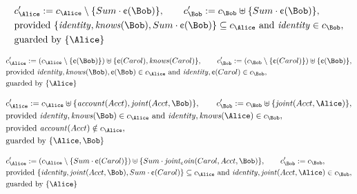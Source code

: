 \begin{align*}
&
c'_
{
\Alice
}
 := 
c_
{
\Alice
}
 \setminus 
\{
Sum
\cdot
\text{\textcent}
(
\Bob
)
\}
, \qquad 
c'_
{
\Bob
}
 := 
c_
{
\Bob
}
 \uplus 
\{
Sum
\cdot
\text{\textcent}
(
\Bob
)
\}
,\\
&
\text{provided } 
\{
\mathit{
identity
}
,
\mathit{
knows
}
(
\Bob
)
,
Sum
\cdot
\text{\textcent}
(
\Bob
)
\}
 \subseteq c_
{
\Alice
}
 \text{ and } 
\mathit{
identity
}
 \in c_
{
\Bob
}
,\\
&
\text{guarded by } \{
\Alice
\}
\end{align*}

\begin{align*}
&
c'_
{
\Alice
}
 := 
(c_
{
\Alice
}
 \setminus 
\{
\text{\textcent}
(
\Bob
)
\}
) \uplus 
\{
\text{\textcent}
(
Carol
)
,
\mathit{
knows
}
(
Carol
)
\}
, \qquad 
c'_
{
\Bob
}
 := 
(c_
{
\Bob
}
 \setminus 
\{
\text{\textcent}
(
Carol
)
\}
) \uplus 
\{
\text{\textcent}
(
\Bob
)
\}
,\\
&
\text{provided } 
\mathit{
identity
}
,
\mathit{
knows
}
(
\Bob
)
,
\text{\textcent}
(
\Bob
)
 \in c_
{
\Alice
}
 \text{ and } 
\mathit{
identity
}
,
\text{\textcent}
(
Carol
)
 \in c_
{
\Bob
}
,\\
&
\text{guarded by } \{
\Alice
\}
\end{align*}

\begin{align*}
&
c'_
{
\Alice
}
 := 
c_
{
\Alice
}
 \uplus 
\{
\mathit{
account
}
(
Acct
)
,
\mathit{
joint
}
(
Acct
,
\Bob
)
\}
, \qquad 
c'_
{
\Bob
}
 := 
c_
{
\Bob
}
 \uplus 
\{
\mathit{
joint
}
(
Acct
,
\Alice
)
\}
,\\
&
\text{provided } 
\mathit{
identity
}
,
\mathit{
knows
}
(
\Bob
)
 \in c_
{
\Alice
}
 \text{ and } 
\mathit{
identity
}
,
\mathit{
knows
}
(
\Alice
)
 \in c_
{
\Bob
}
,\\
&
\text{provided } 
\mathit{
account
}
(
Acct
)
 \notin c_
{
\Alice
}
,\\
&
\text{guarded by } \{
\Alice
,
\Bob
\}
\end{align*}

\begin{align*}
&
c'_
{
\Alice
}
 := 
(c_
{
\Alice
}
 \setminus 
\{
Sum
\cdot
\text{\textcent}
(
Carol
)
\}
) \uplus 
\{
Sum
\cdot
\mathit{
joint_coin
}
(
Carol
,
Acct
,
\Bob
)
\}
, \qquad 
c'_
{
\Bob
}
 := 
c_
{
\Bob
}
,\\
&
\text{provided } 
\{
\mathit{
identity
}
,
\mathit{
joint
}
(
Acct
,
\Bob
)
,
Sum
\cdot
\text{\textcent}
(
Carol
)
\}
 \subseteq c_
{
\Alice
}
 \text{ and } 
\mathit{
identity
}
,
\mathit{
joint
}
(
Acct
,
\Alice
)
 \in c_
{
\Bob
}
,\\
&
\text{guarded by } \{
\Alice
\}
\end{align*}
